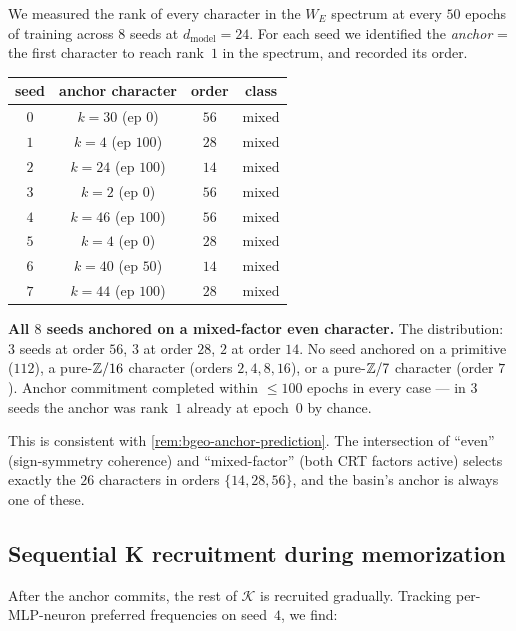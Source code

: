 We measured the rank of every character in the $W_E$ spectrum at every $50$
epochs of training across $8$ seeds at $d_{\text{model}} = 24$.  For each
seed we identified the \emph{anchor} = the first character to reach rank~$1$
in the spectrum, and recorded its order.

\begin{center}
\begin{tabular}{c|c|c|c}
  seed & anchor character & order & class \\ \hline
  $0$ & $k = 30$ (ep $0$)   & $56$ & mixed \\
  $1$ & $k = 4$ (ep $100$)  & $28$ & mixed \\
  $2$ & $k = 24$ (ep $100$) & $14$ & mixed \\
  $3$ & $k = 2$ (ep $0$)    & $56$ & mixed \\
  $4$ & $k = 46$ (ep $100$) & $56$ & mixed \\
  $5$ & $k = 4$ (ep $0$)    & $28$ & mixed \\
  $6$ & $k = 40$ (ep $50$)  & $14$ & mixed \\
  $7$ & $k = 44$ (ep $100$) & $28$ & mixed \\
\end{tabular}
\end{center}

\textbf{All $8$ seeds anchored on a mixed-factor even character.}  The
distribution: $3$ seeds at order $56$, $3$ at order $28$, $2$ at order $14$.
No seed anchored on a primitive ($112$), a pure-$\mathbb{Z}/16$ character
(orders $2, 4, 8, 16$), or a pure-$\mathbb{Z}/7$ character (order $7$).  Anchor
commitment completed within $\leq 100$ epochs in every case --- in $3$ seeds
the anchor was rank~$1$ already at epoch~$0$ by chance.

This is consistent with \cref{rem:bgeo-anchor-prediction}.  The
intersection of ``even'' (sign-symmetry coherence) and ``mixed-factor''
(both CRT factors active) selects exactly the $26$ characters in orders
$\{14, 28, 56\}$, and the basin's anchor is always one of these.

\subsection{Sequential K recruitment during memorization}
\label{subsec:bgeo-sequential}

After the anchor commits, the rest of $\mathcal K$ is recruited gradually.
Tracking per-MLP-neuron preferred frequencies on seed~$4$, we find:


